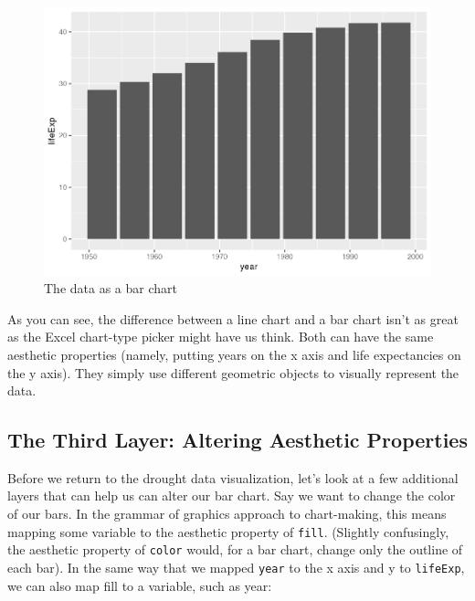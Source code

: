 \documentclass[
]{book}
\begin{document}
\begin{figure}
\includegraphics[width=1\linewidth]{data-viz_files/figure-latex/gapminder-bar-plot-1} \caption{The data as a bar chart}\label{fig:gapminder-bar-plot}
\end{figure}

As you can see, the difference between a line chart and a bar chart isn't as great as the Excel chart-type picker might have us think. Both can have the same aesthetic properties (namely, putting years on the x axis and life expectancies on the y axis). They simply use different geometric objects to visually represent the data.

\hypertarget{the-third-layer-altering-aesthetic-properties}{%
\subsection*{The Third Layer: Altering Aesthetic Properties}\label{the-third-layer-altering-aesthetic-properties}}

Before we return to the drought data visualization, let's look at a few additional layers that can help us can alter our bar chart. Say we want to change the color of our bars. In the grammar of graphics approach to chart-making, this means mapping some variable to the aesthetic property of \texttt{fill}. (Slightly confusingly, the aesthetic property of \texttt{color} would, for a bar chart, change only the outline of each bar). In the same way that we mapped \texttt{year} to the x axis and y to \texttt{lifeExp}, we can also map fill to a variable, such as year:
\end{document}
